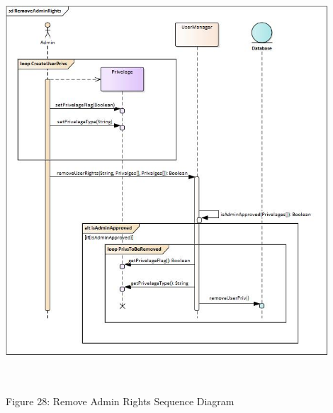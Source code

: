     \includegraphics[width=12cm,height=15cm,keepaspectratio]{admin_ui/images/sequence_diagrams/RemoveAdminRights.jpg}
		\begin{center}
	    \small{Figure 28: Remove Admin Rights Sequence Diagram}
    \end{center}
    
